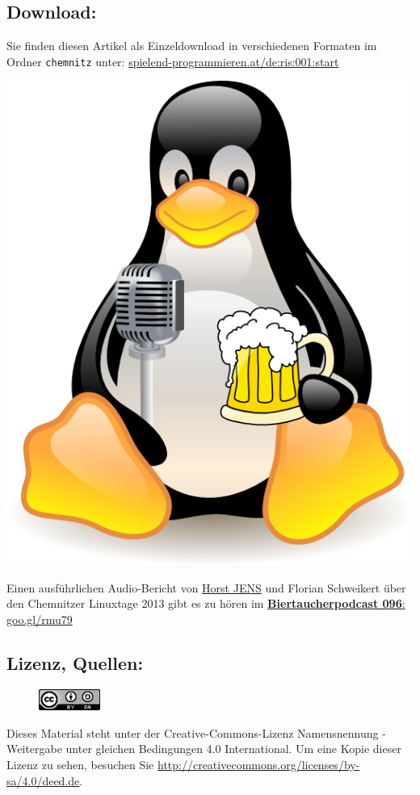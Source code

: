 \subsection*{Download:}
Sie finden diesen Artikel als Einzeldownload in verschiedenen Formaten im Ordner \texttt{chemnitz} unter: 
\href{http://spielend-programmieren.at/de:ris:001:start}{spielend-programmieren.at/de:ris:001:start} 
\begin{center}
\includegraphics[width=0.5\linewidth]{chemnitz-biertaucherlogo.png}
\end{center}
Einen ausführlichen Audio-Bericht von \href{http://spielend-programmieren.at}{Horst JENS} und Florian Schweikert über den Chemnitzer Linuxtage 2013  gibt es zu hören im \href{http://spielend-programmieren.at/de:podcast:biertaucher:2013:096}{\textbf{Biertaucherpodcast 096}: goo.gl/rmu79} \\

\subsection*{Lizenz, Quellen:}
\begin{figure}
\includegraphics[width=2cm]{ccbysa88x31.png}
\end{figure}
Dieses Material steht unter der Creative-Commons-Lizenz Namensnennung - Weitergabe unter gleichen Bedingungen 4.0 International. Um eine Kopie dieser Lizenz zu sehen, besuchen Sie \url{http://creativecommons.org/licenses/by-sa/4.0/deed.de}. \\

